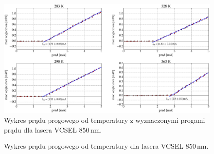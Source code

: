 \begin{figure}
\center
  \includegraphics[scale=0.30]{plot_vcsel_850/plot_fit_i_th.eps}
  \caption{Wykres prądu progowego od temperatury z wyznaczonymi progami prądu dla lasera VCSEL 850\,nm.}
  \label{fig:rys5}
\end{figure}
\begin{figure}
\center
  
  \caption{Wykres prądu progowego od temperatury dla lasera VCSEL 850\,nm.}
  \label{fig:rys6}
\end{figure}
